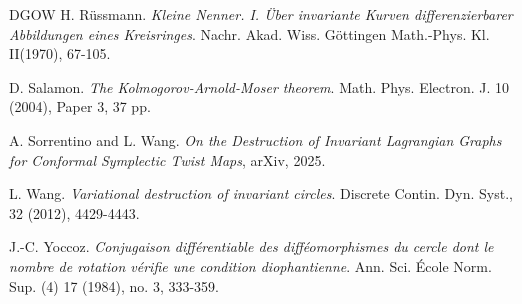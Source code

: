 \documentclass{amsart}
\theoremstyle{definition}
\begin{document}
\begin{thebibliography}{DGOW}
			 H. R\"{u}ssmann.  {\it Kleine Nenner. I. \"{U}ber invariante Kurven differenzierbarer Abbildungen eines Kreisringes}. Nachr. Akad. Wiss. G\"{o}ttingen Math.-Phys. Kl. II(1970), 67-105.



 D. Salamon. {\it The Kolmogorov-Arnold-Moser theorem}.
Math. Phys. Electron. J. 10 (2004), Paper 3, 37 pp.

 A. Sorrentino and L. Wang. {\it On the Destruction of Invariant Lagrangian Graphs for Conformal Symplectic Twist Maps}, {arXiv}, 2025.

%
%
%
%


 L. Wang. {\it Variational destruction of invariant
circles}. {Discrete Contin. Dyn. Syst.}, 32
(2012), 4429-4443.


 J.-C. Yoccoz. {\it
Conjugaison diff\'{e}rentiable des diff\'{e}omorphismes du cercle dont le nombre de rotation v\'{e}rifie une condition diophantienne}.
Ann. Sci. \'{E}cole Norm. Sup. (4) 17 (1984), no. 3, 333-359.













%







\end{thebibliography}
\end{document}
